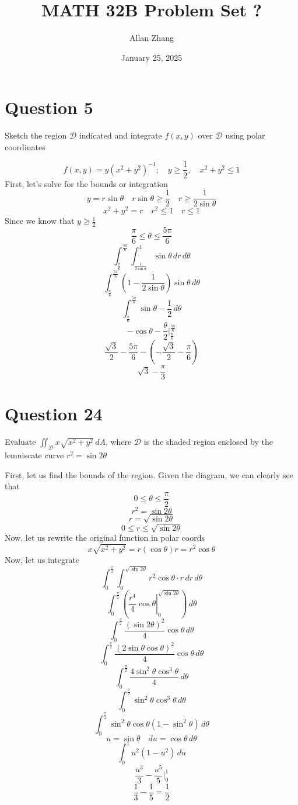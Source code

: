 \documentclass[hidelinks]{article}
\title{\textbf{MATH 32B Problem Set ?}}
\author{Allan Zhang}
\date{January 25, 2025}
\begin{document}
\hypersetup{bookmarksnumbered=true,}
\pagecolor{white}
\color{black}
\maketitle

\section{Question 5}
Sketch the region $\mathcal{D}$ indicated and integrate $f(x,y)$ over $\mathcal{D}$ using polar coordinates

\[
    f(x,y) = y(x^2+y^2)^{-1}; \quad y \geq \frac{1}{2}, \quad x^2+y^2 \leq 1
\]
First, let's solve for the bounds or integration
\[
    y = r \sin\theta \quad r\sin\theta \geq \frac{1}{2} \quad r \geq \frac{1}{2\sin\theta}
\]
\[
    x^2+y^2 = r \quad r^2 \leq 1 \quad r \leq 1
\]
Since we know that $y \geq \frac{1}{2}$
\[
    \frac{\pi}{6} \leq \theta \leq \frac{5\pi}{6}
\]
\[
    \int_{\frac{\pi}{6}}^{\frac{5\pi}{6}} \int_{\frac{1}{2\sin\theta}}^{1}  \sin\theta \,dr \, d\theta  
\]
\[
    \int_{\frac{\pi}{6}}^{\frac{5\pi}{6}} (1-\frac{1}{2\sin\theta}) \sin\theta \, d\theta 
\]
\[
    \int_{\frac{\pi}{6}}^{\frac{5\pi}{6}} \sin\theta - \frac{1}{2} \, d\theta 
\]
\[
-\cos\theta - \frac{\theta}{2} \Big|_{\frac{\pi}{6}}^{\frac{5\pi}{6}}
\]
\[
    \frac{\sqrt{3}}{2} - \frac{5\pi}{6} - (- \frac{\sqrt{3}}{2} - \frac{\pi}{6})
\]
\[
    \sqrt{3} - \frac{\pi}{3}
\]
\newpage
\section{Question 24}
Evaluate $\iint_{\mathcal{D}} x \sqrt{x^2+y^2} \, dA$, where $\mathcal{D}$ is the shaded region enclosed by the lemniscate curve $r^2 = \sin2\theta$
\vspace{0.2cm}

First, let us find the bounds of the region. Given the diagram, we can clearly see that 
\[
    0 \leq \theta \leq \frac{\pi}{2}
\]
\[
    r^2 = \sin2\theta
\]
\[
    r = \sqrt{\sin2\theta} 
\]
\[
    0 \leq r \leq \sqrt{\sin2\theta}
\]
Now, let us rewrite the original function in polar coords
\[
    x\sqrt{x^2+y^2} = r(\cos\theta) r = r^2 \cos\theta
\]
Now, let us integrate
\[
    \int_0^{\frac{\pi}{2}} \int_0^{\sqrt{\sin2\theta}} r^2 \cos\theta \cdot r \, dr \, d \theta
\]
\[
    \int_0^{\frac{\pi}{2}} \left ( \left . \frac{r^4}{4} \cos\theta \right |_0^{\sqrt{\sin2\theta}}  \right ) \, d \theta
\]
\[
    \int_0^{\frac{\pi}{2}} \frac{(\sin2\theta)^2}{4} \cos\theta \, d \theta
\]
\[ 
    \int_0^{\frac{\pi}{2}} \frac{(2\sin\theta\cos\theta)^2}{4} \cos\theta \, d \theta
\]
\[ 
    \int_0^{\frac{\pi}{2}} \frac{4\sin^2\theta\cos^3\theta}{4} \, d \theta
\]
\[ 
    \int_0^{\frac{\pi}{2}} \sin^2\theta\cos^3\theta \, d \theta
\]
\[
    \int_0^{\frac{\pi}{2}} \sin^2\theta\cos\theta(1-\sin^2\theta) \, d \theta
\]
\[
    u = \sin\theta \quad du = \cos\theta \, d\theta
\]
\[
    \int_0^1 u^2 (1-u^2) \, du
\]
\[
    \frac{u^3}{3} - \frac{u^5}{5} \Big |_0^1
\]
\[
    \frac{1}{3} - \frac{1}{5} = \frac{1}{2}
\]
\newpage
\end{document}
